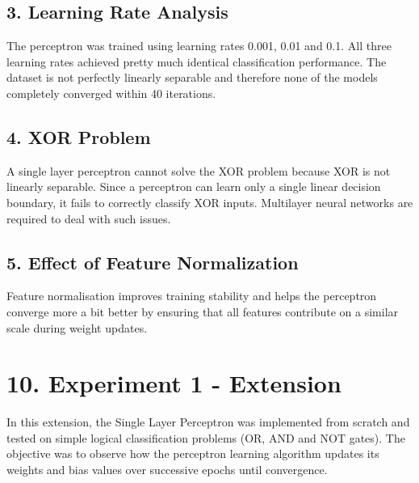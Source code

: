 \documentclass[11pt]{article}
\begin{document}
\subsection*{3. Learning Rate Analysis}

The perceptron was trained using learning rates 0.001, 0.01 and 0.1. All three learning rates achieved pretty much identical classification performance. The dataset is not perfectly linearly separable and therefore none of the models completely converged within 40 iterations.

\vspace{5mm}

\subsection*{4. XOR Problem}

A single layer perceptron cannot solve the XOR problem because XOR is not linearly separable. Since a perceptron can learn only a single linear decision boundary, it fails to correctly classify XOR inputs. Multilayer neural networks are required to deal with such issues.

\vspace{5mm}

\subsection*{5. Effect of Feature Normalization}

Feature normalisation improves training stability and helps the perceptron converge more a bit better by ensuring that all features contribute on a similar scale during weight updates.


\section*{10. Experiment 1 - Extension}

In this extension, the Single Layer Perceptron was implemented from scratch and tested on simple logical classification problems (OR, AND and NOT gates). The objective was to observe how the perceptron learning algorithm updates its weights and bias values over successive epochs until convergence.

\vspace{4mm}
\end{document}
